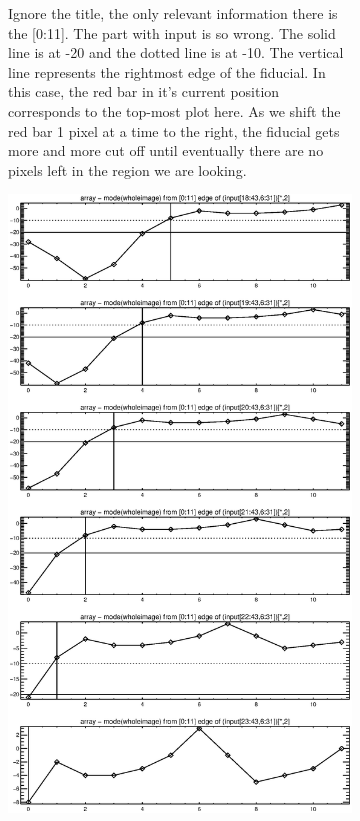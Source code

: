 \documentclass[10pt]{article}
\begin{document}
\begin{figure}[!h]
\begin{subfigure}[b]{.4\linewidth}
        \caption{Ignore the title, the only relevant information there is the [0:11]. The part with input is so wrong. The solid line is at -20 and the dotted line is at -10. The vertical line represents the rightmost edge of the fiducial. In this case, the red bar in it's current position corresponds to the top-most plot here. As we shift the red bar 1 pixel at a time to the right, the fiducial gets more and more cut off until eventually there are no pixels left in the region we are looking.}
        \label{primeone}
    \end{subfigure}
    \hspace{1.0in}
    \begin{subfigure}[b]{.4\linewidth}
        \centering
        \includegraphics[width=1.4\textwidth]{../plots_tables_images/botleft1.eps} 

\end{subfigure}
\end{figure}
\end{document}
